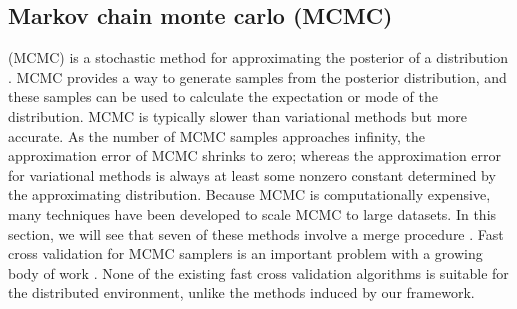 \documentclass[thesis.tex]{subfiles}
\begin{document}

\subsection{Markov chain monte carlo (MCMC)}
\label{sec:merge:mcmc}

 (MCMC) is a stochastic method for approximating the posterior of a distribution \citep[e.g.][]{andrieu2003introduction}.
MCMC provides a way to generate samples from the posterior distribution,
and these samples can be used to calculate the expectation or mode of the distribution.
MCMC is typically slower than variational methods but more accurate.
As the number of MCMC samples approaches infinity,
the approximation error of MCMC shrinks to zero;
whereas the approximation error for variational methods is always at least some nonzero constant determined by the approximating distribution.
Because MCMC is computationally expensive,
many techniques have been developed to scale MCMC to large datasets. 
In this section, we will see that seven of these methods involve a merge procedure
\citep{
wang2013parallelizing,
minsker2014scalable,
neiswanger2014asymptotically,
wang2015parallelizing, 
white2015piecewise,
srivastava2015wasp,
nemeth2016merging,
scott2016bayes}.
Fast cross validation for MCMC samplers is an important problem with a growing body of work
\citep{marshall2003approximate,
bhattacharya2007importance,
bornn2010efficient,
held2010posterior,
vehtari2012survey,
li2016approximating}.
None of the existing fast cross validation algorithms is suitable for the distributed environment,
unlike the methods induced by our framework.
\end{document}
